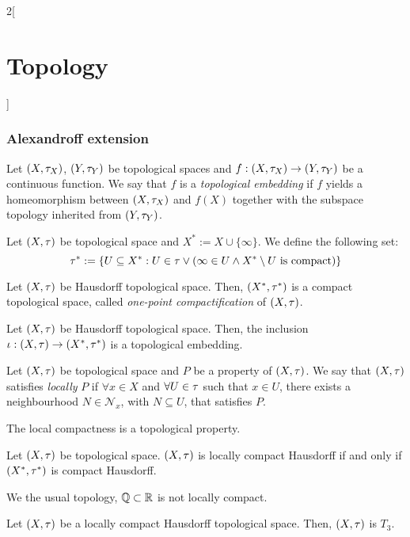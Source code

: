 \documentclass[../../../main.tex]{subfiles}
\begin{document}
\begin{multicols}{2}[\section{Topology}]
  \subsubsection{Alexandroff extension}
  \begin{definition}
    Let $(X,\tau_X)$, $(Y,\tau_Y)$ be topological spaces and $f:(X,\tau_X)\rightarrow(Y,\tau_Y)$ be a continuous function. We say that $f$ is a \emph{topological embedding} if $f$ yields a homeomorphism between $(X,\tau_X)$ and $f(X)$ together with the subspace topology inherited from $(Y,\tau_Y)$.
  \end{definition}
  \begin{definition}
    Let $(X,\tau)$ be topological space and $X^*:=X\cup\{\infty\}$. We define the following set:
    $$\tau^*:=\{U\subseteq X^*:U\in\tau\lor(\infty\in U\land X^*\setminus U\text{ is compact})\}$$
  \end{definition}
  \begin{theorem}
    Let $(X,\tau)$ be Hausdorff topological space. Then, $(X^*,\tau^*)$ is a compact topological space, called \emph{one-point compactification} of $(X,\tau)$.
  \end{theorem}
  \begin{prop}
    Let $(X,\tau)$ be Hausdorff topological space. Then, the inclusion $\iota: (X,\tau)\rightarrow(X^*,\tau^*)$ is a topological embedding.
  \end{prop}
  \begin{definition}
    Let $(X,\tau)$ be topological space and $P$ be a property of $(X,\tau)$. We say that $(X,\tau)$ satisfies \emph{locally} $P$ if $\forall x\in X$ and $\forall U\in\tau$ such that $x\in U$, there exists a neighbourhood $N\in\mathcal{N}_x$, with $N\subseteq U$, that satisfies $P$.
  \end{definition}
  \begin{prop}
    The local compactness is a topological property.
  \end{prop}
  \begin{definition}
    Let $(X,\tau)$ be topological space. $(X,\tau)$ is locally compact Hausdorff if and only if $(X^*,\tau^*)$ is compact Hausdorff.
  \end{definition}
  \begin{prop}
    We the usual topology, $\mathbb{Q}\subset \mathbb{R}$ is not locally compact.
  \end{prop}
  \begin{theorem}
    Let $(X,\tau)$ be a locally compact Hausdorff topological space. Then, $(X,\tau)$ is $T_3$.
  \end{theorem}

\end{multicols}
\end{document}
